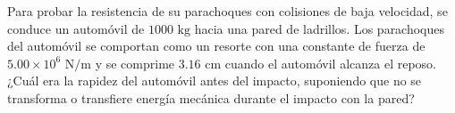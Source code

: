 \item Para probar la resistencia de su parachoques con colisiones de baja velocidad, se conduce un automóvil de $1000\text{ kg}$ hacia una pared de ladrillos. Los parachoques del automóvil se comportan como un resorte con una constante de fuerza de $5.00 \times 10^6\text{ N/m}$ y se comprime $3.16\text{ cm}$ cuando el automóvil alcanza el reposo. ¿Cuál era la rapidez del automóvil antes del impacto, suponiendo que no se transforma o transfiere energía mecánica durante el impacto con la pared?